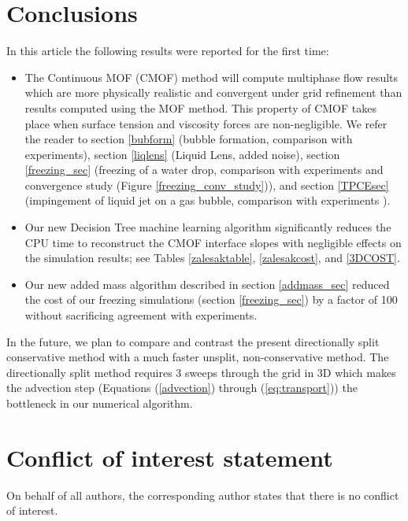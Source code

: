 \documentclass[]{article}
\begin{document}
\section{Conclusions}

In this article the following results were reported for the
first time:
\begin{itemize}
	\item The Continuous MOF (CMOF) method will compute multiphase
		flow results which are more physically realistic and
		convergent under grid refinement than results computed
		using the MOF method.  This property of CMOF takes place
		when surface tension and viscosity forces are non-negligible.
		We refer the reader to section \ref{bubform} 
		(bubble formation, comparison with 
		experiments\cite{helsby1955behaviour}),
		section \ref{liqlens} (Liquid Lens, added noise),
		section \ref{freezing_sec}
		(freezing of a water drop, comparison with 
		experiments\cite{hu2010icing} and convergence study
		(Figure \ref{freezing_conv_study})), and
		section \ref{TPCEsec} (impingement of liquid jet on a
		gas bubble, comparison with experiments 
		\cite{bentz1992jet}).
	\item Our new Decision Tree machine learning algorithm 
		significantly reduces the CPU time to reconstruct
		the CMOF interface slopes with negligible
		effects on the simulation results; see Tables
		\ref{zalesaktable}, \ref{zalesakcost}, and
		\ref{3DCOST}.
	\item Our new added mass algorithm described in 
		section \ref{addmass_sec} reduced the cost of 
		our freezing simulations 
		(section \ref{freezing_sec}) by a factor of 100 without
		sacrificing agreement with experiments.
\end{itemize}

In the future, we plan to compare and contrast the present directionally split
conservative method with a much faster unsplit, non-conservative method.
The directionally split method requires 3 sweeps through the grid in 3D which
makes the advection step (Equations (\ref{advection}) through
(\ref{eq:transport})) the bottleneck in our
numerical algorithm.

\section{Conflict of interest statement }

On behalf of all authors, the corresponding author states that there is no conflict of interest.


\end{document}
